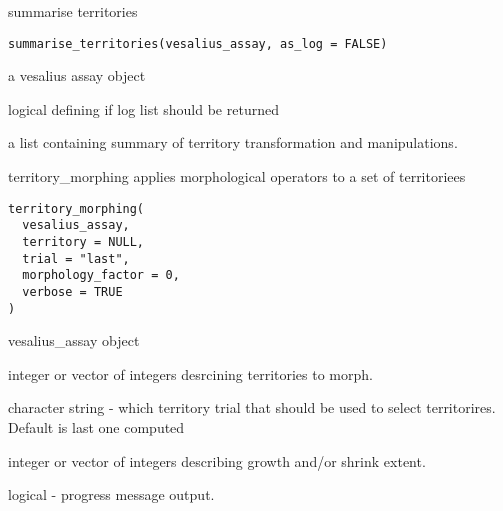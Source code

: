\documentclass[a4paper]{book}
\begin{document}
%
\begin{Description}
summarise territories
\end{Description}
%
\begin{Usage}
\begin{verbatim}
summarise_territories(vesalius_assay, as_log = FALSE)
\end{verbatim}
\end{Usage}
%
\begin{Arguments}
\begin{ldescription}
\item[\code{vesalius\_assay}] a vesalius assay object

\item[\code{as\_log}] logical defining if log list should be returned
\end{ldescription}
\end{Arguments}
%
\begin{Value}
a list containing summary of territory transformation
and manipulations.
\end{Value}
%
\begin{Description}
territory\_morphing applies morphological operators to a set of territoriees
\end{Description}
%
\begin{Usage}
\begin{verbatim}
territory_morphing(
  vesalius_assay,
  territory = NULL,
  trial = "last",
  morphology_factor = 0,
  verbose = TRUE
)
\end{verbatim}
\end{Usage}
%
\begin{Arguments}
\begin{ldescription}
\item[\code{vesalius\_assay}] vesalius\_assay object

\item[\code{territory}] integer or vector of integers desrcining territories 
to morph.

\item[\code{trial}] character string - which territory trial that 
should be used to select
territorires. Default is last one computed

\item[\code{morphology\_factor}] integer or vector of integers describing growth
and/or shrink extent.

\item[\code{verbose}] logical - progress message output.
\end{ldescription}
\end{Arguments}
\end{document}
